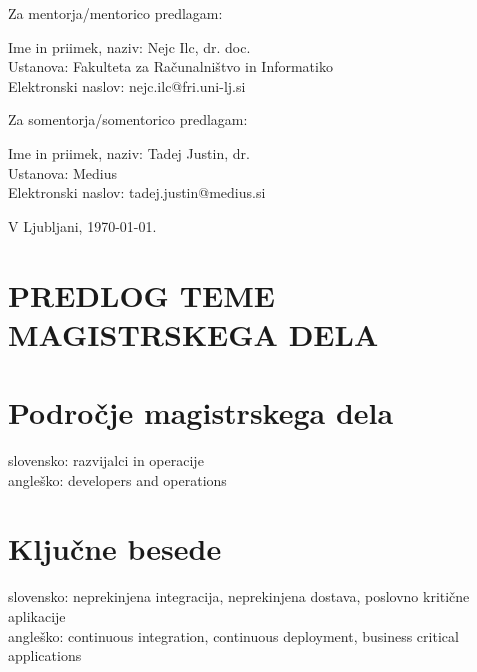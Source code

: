 \documentclass[a4paper, 12pt]{article}
\begin{document}
Za mentorja/mentorico predlagam:

\hfill\begin{minipage}{\dimexpr\textwidth-2cm}
Ime in priimek, naziv: Nejc Ilc, dr. doc. \\
Ustanova: Fakulteta za Računalništvo in Informatiko \\
Elektronski naslov: nejc.ilc@fri.uni-lj.si
\end{minipage}

Za somentorja/somentorico predlagam:

\hfill\begin{minipage}{\dimexpr\textwidth-2cm}
Ime in priimek, naziv: Tadej Justin, dr. \\
Ustanova: Medius \\
Elektronski naslov:  tadej.justin@medius.si \\
\end{minipage}




\bigskip


\hfill V Ljubljani, \today.
%




\clearpage
\section*{PREDLOG TEME MAGISTRSKEGA DELA}

\section{Področje magistrskega dela}

slovensko: razvijalci in operacije \\
angleško: developers and operations


\section{Ključne besede}

slovensko: neprekinjena integracija, neprekinjena dostava, poslovno kritične aplikacije   \\
angleško: continuous integration, continuous deployment, business critical applications
\end{document}
